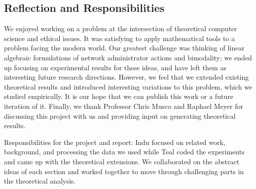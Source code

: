 \subsection{Reflection and Responsibilities}
We enjoyed working on a problem at the intersection
of theoretical computer science and ethical issues.
It was satisfying to apply mathematical tools
to a problem facing the modern world.
Our greatest challenge was thinking of linear algebraic formulations of network administrator actions and bimodality; we ended up focusing on experimental results for these ideas, and have left them as interesting future research directions. 
However, we feel that we extended existing theoretical results
and introduced interesting variations to this problem, which we studied
empirically. 
It is our hope that we can publish this work or a future
iteration of it.
Finally, we thank Professor Chris Musco and Raphael Meyer for discussing this project with us and providing input on generating theoretical results. 


Responsibilities for the project and report:
Indu focused on related work, background, and processing
the data we used while
Teal coded the experiments and came up with the
theoretical extensions.
We collaborated on the abstract ideas of each section
and worked together to move through challenging parts
in the theoretical analysis.
